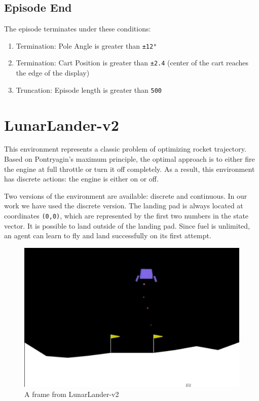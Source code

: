 \documentclass{article} %
\begin{document}
\subsection{Episode End}
The episode terminates under these conditions:

\begin{enumerate}
    \item Termination: Pole Angle is greater than \verb|±12°|
    \item Termination: Cart Position is greater than \verb|±2.4| (center of the cart
    reaches the edge of the display)
    \item Truncation: Episode length is greater than \verb|500|
\end{enumerate}


\section{LunarLander-v2}

This environment represents a classic problem of optimizing rocket trajectory. Based on Pontryagin’s maximum principle, the optimal approach is to either fire the engine at full throttle or turn it off completely. As a result, this environment has discrete actions: the engine is either on or off.

Two versions of the environment are available: discrete and continuous. In our work we have used the discrete version. The landing pad is always located at coordinates \verb|(0,0)|, which are represented by the first two numbers in the state vector. It is possible to land outside of the landing pad. Since fuel is unlimited, an agent can learn to fly and land successfully on its first attempt.

\begin{figure}[h]
    \begin{center}
        \includegraphics[width=\textwidth]{lunar_lander.png}
    \end{center}
    \caption{A frame from LunarLander-v2}
    \label{fig:mcar-rendering}
\end{figure}
\end{document}
